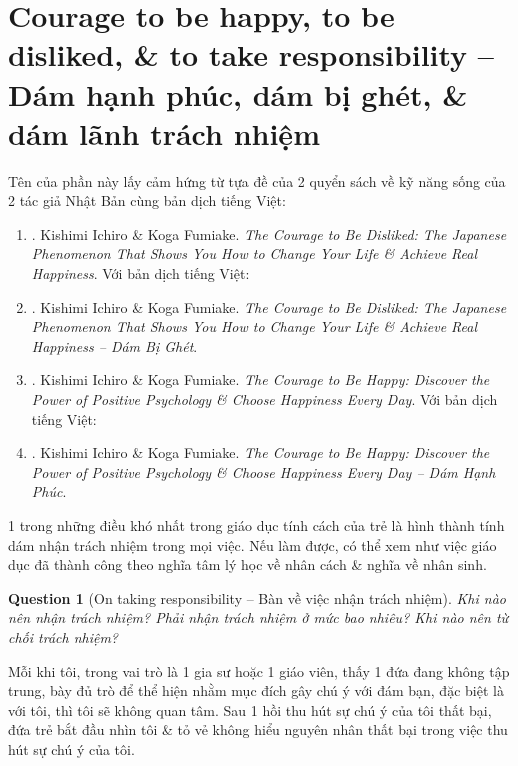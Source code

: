 \documentclass[12pt,twoside]{book}
\newtheorem{question}{Question}
\begin{document}
\section{Courage to be happy, to be disliked, \& to take responsibility -- Dám hạnh phúc, dám bị ghét, \& dám lãnh trách nhiệm}
Tên của phần này lấy cảm hứng từ tựa đề của 2 quyển sách về kỹ năng sống của 2 tác giả Nhật Bản cùng bản dịch tiếng Việt:
\begin{enumerate}
	\item \cite{Ichiro_Fumitake_disliked}. {\sc Kishimi Ichiro \& Koga Fumiake}. {\it The Courage to Be Disliked: The Japanese Phenomenon That Shows You How to Change Your Life \& Achieve Real Happiness}. Với bản dịch tiếng Việt:
	\item \cite{Ichiro_Fumitake_disliked_VN}. {\sc Kishimi Ichiro \& Koga Fumiake}. {\it The Courage to Be Disliked: The Japanese Phenomenon That Shows You How to Change Your Life \& Achieve Real Happiness -- Dám Bị Ghét}.
	\item \cite{Ichiro_Fumitake_happy}. {\sc Kishimi Ichiro \& Koga Fumiake}. {\it The Courage to Be Happy: Discover the Power of Positive Psychology \& Choose Happiness Every Day}. Với bản dịch tiếng Việt:
	\item \cite{Ichiro_Fumitake_happy_VN}. {\sc Kishimi Ichiro \& Koga Fumiake}. {\it The Courage to Be Happy: Discover the Power of Positive Psychology \& Choose Happiness Every Day -- Dám Hạnh Phúc}.
\end{enumerate}
1 trong những điều khó nhất trong giáo dục tính cách của trẻ là hình thành tính dám nhận trách nhiệm trong mọi việc. Nếu làm được, có thể xem như việc giáo dục đã thành công theo nghĩa tâm lý học về nhân cách \& nghĩa về nhân sinh.

\begin{question}[On taking responsibility -- Bàn về việc nhận trách nhiệm]
	Khi nào nên nhận trách nhiệm? Phải nhận trách nhiệm ở mức bao nhiêu? Khi nào nên từ chối trách nhiệm?
\end{question}
Mỗi khi tôi, trong vai trò là 1 gia sư hoặc 1 giáo viên, thấy 1 đứa đang không tập trung, bày đủ trò để thể hiện nhằm mục đích gây chú ý với đám bạn, đặc biệt là với tôi, thì tôi sẽ không quan tâm. Sau 1 hồi thu hút sự chú ý của tôi thất bại, đứa trẻ bắt đầu nhìn tôi \& tỏ vẻ không hiểu nguyên nhân thất bại trong việc thu hút sự chú ý của tôi.
\end{document}
